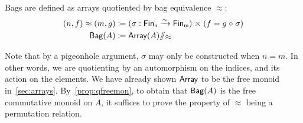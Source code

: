 \begin{definition}
    \label{def:bag}
    Bags are defined as arrays quotiented by bag equivalence $\approx$:
    \begin{align*}
        (n , f) \approx (m , g) & \defeq \dsum{\sigma : \Fin[n] \xto{\sim} \Fin[m]} (f = g \comp \sigma)
        \\
        \Bag(A)                 & \defeq \quot{\Array(A)}{\approx}
    \end{align*}
\end{definition}
%
Note that by a pigeonhole argument,
$\sigma$ may only be constructed when $n = m$.
%
In other words, we are quotienting by an automorphism on the indices,
and its action on the elements.
%
We have already shown $\operatorname{\mathsf{Array}}$ to be the free monoid in~\cref{sec:arrays}.
%
By~\cref{prop:qfreemon}, to obtain that $\operatorname{\mathsf{Bag}}(A)$ is the free commutative monoid on $A$, it suffices to prove the property of $\approx$ being a permutation relation.

